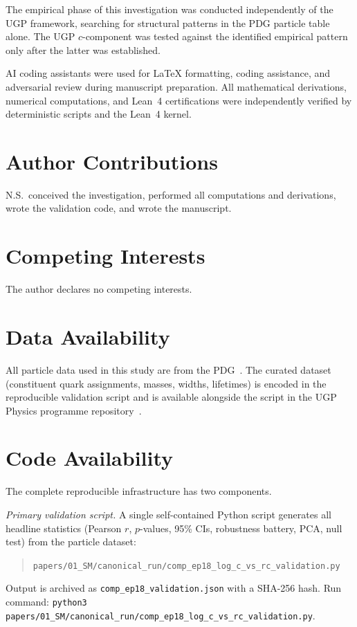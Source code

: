 \documentclass[12pt,a4paper]{article}
\begin{document}
The empirical phase of this investigation was conducted independently
of the UGP framework, searching for structural patterns in the PDG particle
table alone.
The UGP $c$-component was tested against the identified empirical pattern
only after the latter was established.

AI coding assistants were used for LaTeX formatting, coding assistance, and adversarial review during manuscript preparation. All mathematical derivations, numerical computations, and Lean~4 certifications were independently verified by deterministic scripts and the Lean~4 kernel.

\section*{Author Contributions}
N.S.\ conceived the investigation, performed all computations and derivations,
wrote the validation code, and wrote the manuscript.

\section*{Competing Interests}
The author declares no competing interests.

\section*{Data Availability}
All particle data used in this study are from the
PDG~\cite{ParticleDataGroup2024}.
The curated dataset (constituent quark assignments, masses, widths, lifetimes)
is encoded in the reproducible validation script and is available alongside
the script in the UGP Physics programme repository~\cite{SpivackNEMSHub,SpivackResearchProgrammes}.

\section*{Code Availability}
The complete reproducible infrastructure has two components.

\emph{Primary validation script.}
A single self-contained Python script generates all headline statistics
(Pearson $r$, $p$-values, 95\% CIs, robustness battery, PCA, null test)
from the particle dataset:
\begin{quote}
\nolinkurl{papers/01_SM/canonical_run/comp_ep18_log_c_vs_rc_validation.py}
\end{quote}
Output is archived as \texttt{comp\_ep18\_validation.json} with a SHA-256 hash.
Run command: \texttt{python3 papers/01\_SM/canonical\_run/comp\_ep18\_log\_c\_vs\_rc\_validation.py}.
\end{document}
